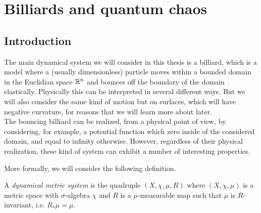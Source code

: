 
\chapter{Billiards and quantum chaos} %

\label{Chapter05} %
\thispagestyle{empty}

\section{Introduction}
\label{sec:intro}


The main  dynamical system we will consider in this thesis is a billiard, which is a model where a (usually dimensionless) particle moves within a bounded domain in the Euclidian space $\mathbb{R}^{n}$ and bounces off the boundary of the domain elastically. Physically this can be interpreted in several different ways. But we will also consider the same kind of motion but on surfaces, which will have negative curvature, for reasons that we will learn more about later.\\

The bouncing billiard can be realized, from a physical point of view, by considering, for example, a potential function which zero inside of the considered domain, and equal to infinity otherwise. However, regardless of their physical realization, these kind of system can exhibit a number of interesting properties.

More formally, we will consider the following definition.

\begin{defin}
A \emph{dynamical metric system} is the quadruple $(X,\chi,\mu,R)$ where $(X,\chi,\mu)$ is a metric space with $\sigma$-algebra $\chi$ and $R$ is a $\mu$-measurable map such that $\mu$ is $R$-invariant, i.e. $R_{\ast}\mu=\mu$. 
\end{defin}

